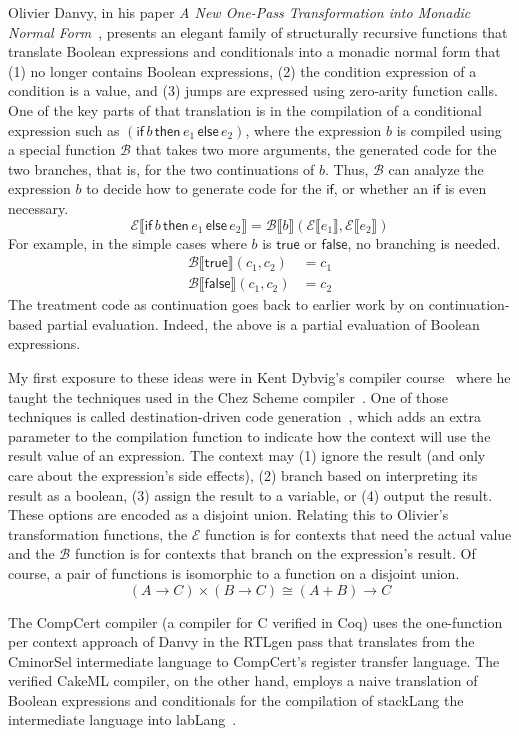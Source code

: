 \documentclass[sigplan,review,dvipsnames,screen,10pt]{acmart}
\newcommand{\TRUE}[0]{\mathsf{true}}
\newcommand{\FALSE}[0]{\mathsf{false}}
\newcommand{\IF}[3]{\mathsf{if}\,#1\,\mathsf{then}\,#2\,\mathsf{else}\,#3}
\newcommand{\CE}[1]{\mathcal{E} \llbracket #1 \rrbracket}
\newcommand{\CB}[3]{\mathcal{B} \llbracket #1 \rrbracket ( #2, #3 )}
\begin{document}
Olivier Danvy, in his paper \emph{A New One-Pass Transformation into
Monadic Normal Form}~\citep{Danvy:2003fk}, presents an elegant family
of structurally recursive functions that translate Boolean expressions
and conditionals into a monadic normal form that (1) no longer
contains Boolean expressions, (2) the condition expression of a
condition is a value, and (3) jumps are expressed using zero-arity
function calls. One of the key parts of that translation is in the
compilation of a conditional expression such as $(\IF{b}{e_1}{e_2})$,
where the expression $b$ is compiled using a special function
$\mathcal{B}$ that takes two more arguments, the generated code for
the two branches, that is, for the two continuations of $b$. Thus,
$\mathcal{B}$ can analyze the expression $b$ to decide how to generate
code for the $\mathsf{if}$, or whether an $\mathsf{if}$ is even
necessary.
\[
\CE{\IF{b}{e_1}{e_2}} = \CB{b}{\CE{e_1}}{\CE{e_2}}
\]
For example, in the simple cases where $b$ is $\TRUE$ or $\FALSE$,
no branching is needed.
\begin{align*}
\CB{\TRUE}{c_1}{c_2} &= c_1 \\
\CB{\FALSE}{c_1}{c_2} &= c_2
\end{align*}
\noindent The treatment code as continuation goes back to earlier work
by \citet{Lawall:1994aa} on continuation-based partial
evaluation. Indeed, the above is a partial evaluation of Boolean
expressions.

My first exposure to these ideas were in Kent Dybvig's compiler
course~\citep{Dybvig:2010aa} where he taught the techniques used in
the Chez Scheme compiler~\citep{Dybvig:2006aa}.  One of those
techniques is called destination-driven code
generation~\citep{Dybvig:1990aa}, which adds an extra parameter to the
compilation function to indicate how the context will use the result
value of an expression. The context may (1) ignore the result (and
only care about the expression's side effects), (2) branch based on
interpreting its result as a boolean, (3) assign the result to a
variable, or (4) output the result. These options are encoded as a
disjoint union.  Relating this to Olivier's transformation functions,
the $\mathcal{E}$ function is for contexts that need the actual value
and the $\mathcal{B}$ function is for contexts that branch on the
expression's result. Of course, a pair of functions is isomorphic to a
function on a disjoint union.
\[
(A → C) × (B → C) ≅ (A + B) → C
\]

The CompCert compiler \citep{Leroy:2006fe} (a compiler for C verified
in Coq) uses the one-function per context approach of Danvy in the
RTLgen pass that translates from the CminorSel intermediate language
to CompCert's register transfer language. The verified CakeML
compiler, on the other hand, employs a naive translation of Boolean
expressions and conditionals for the compilation of stackLang the
intermediate language into labLang~\citep{Kumar:2014aa}.
\end{document}
